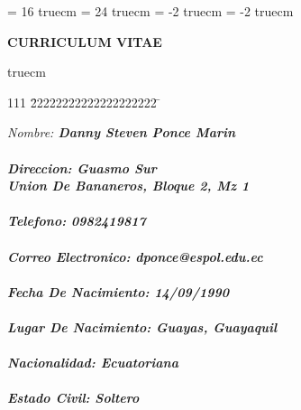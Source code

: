 
\textwidth  =  16 truecm
\textheight =  24 truecm
\hoffset    = -2  truecm
\voffset    = -2  truecm



\begin{center}
{\huge \bf CURRICULUM VITAE}
\end{center}

 truecm

\begin{tabbing}

111 \= 22222222222222222222 \= \kill

\> \it Nombre:                \> \bf Danny Steven Ponce Marin                    \\ \\

\> {\it Direccion:}   \> {Guasmo Sur} \\
\>                          \> {Union De Bananeros, Bloque 2, Mz 1}                      \\ \\

\> {\it Telefono:}    \> {0982419817}                                  \\ \\

\> {\it Correo Electronico:}    \> {dponce@espol.edu.ec}                                  \\ \\

\> {\it Fecha De Nacimiento:}     \> {14/09/1990}
\\ \\

\> {\it Lugar De Nacimiento:}    \> {Guayas, \bf{Guayaquil}}
\\ \\

\> {\it Nacionalidad:}       \> {Ecuatoriana}                             \\ \\

\> {\it Estado Civil:}    \> {Soltero}                                 \\ \\ \\



\end{tabbing}
